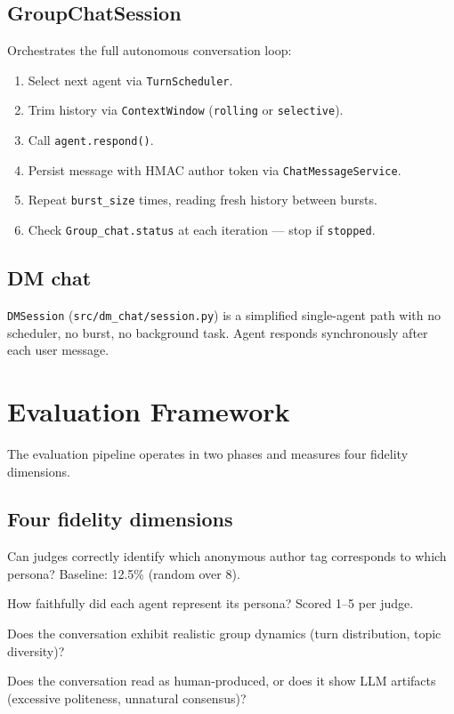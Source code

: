 \documentclass[12pt,a4paper]{article}
\begin{document}
\subsection{GroupChatSession}

Orchestrates the full autonomous conversation loop:
\begin{enumerate}
  \item Select next agent via \texttt{TurnScheduler}.
  \item Trim history via \texttt{ContextWindow} (\texttt{rolling} or \texttt{selective}).
  \item Call \texttt{agent.respond()}.
  \item Persist message with HMAC author token via \texttt{ChatMessageService}.
  \item Repeat \texttt{burst\_size} times, reading fresh history between bursts.
  \item Check \texttt{Group\_chat.status} at each iteration --- stop if \texttt{stopped}.
\end{enumerate}

\subsection{DM chat}

\texttt{DMSession} (\texttt{src/dm\_chat/session.py}) is a simplified single-agent path with
no scheduler, no burst, no background task. Agent responds synchronously after each user
message.

\section{Evaluation Framework}

The evaluation pipeline operates in two phases and measures four fidelity dimensions.

\subsection{Four fidelity dimensions}

\begin{description}[leftmargin=3cm,labelwidth=2.8cm]
  \item[Persona ID] Can judges correctly identify which anonymous author tag corresponds to
        which persona? Baseline: 12.5\% (random over 8).
  \item[Individual] How faithfully did each agent represent its persona? Scored 1--5 per judge.
  \item[Group] Does the conversation exhibit realistic group dynamics (turn distribution,
        topic diversity)?
  \item[Behavioral] Does the conversation read as human-produced, or does it show LLM
        artifacts (excessive politeness, unnatural consensus)?
\end{description}
\end{document}

